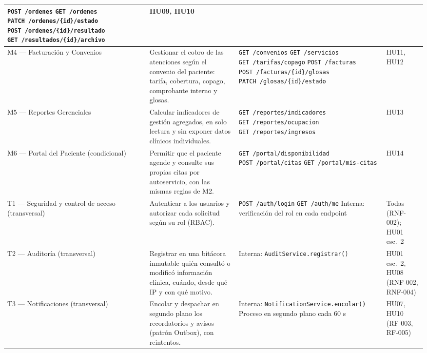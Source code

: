 \documentclass[11pt,a4paper]{article}
\newcommand{\ep}[2]{{\footnotesize\texttt{\textcolor{guinda}{#1}~#2}}}
\begin{document}
\begin{xltabular}{\linewidth}{|P{2.9cm}|L|P{5.6cm}|P{2.3cm}|}
    \ep{POST}{/ordenes} \newline
    \ep{GET}{/ordenes} \newline
    \ep{PATCH}{/ordenes/\{id\}/estado} \newline
    \ep{POST}{/ordenes/\{id\}/resultado} \newline
    \ep{GET}{/resultados/\{id\}/archivo} &
    HU09, HU10 \\ \hline
  M4 --- Facturación y Convenios &
    Gestionar el cobro de las atenciones según el convenio del paciente: tarifa, cobertura,
    copago, comprobante interno y glosas. &
    \ep{GET}{/convenios} \newline
    \ep{GET}{/servicios} \newline
    \ep{GET}{/tarifas/copago} \newline
    \ep{POST}{/facturas} \newline
    \ep{POST}{/facturas/\{id\}/glosas} \newline
    \ep{PATCH}{/glosas/\{id\}/estado} &
    HU11, HU12 \\ \hline
  M5 --- Reportes Gerenciales &
    Calcular indicadores de gestión agregados, en solo lectura y sin exponer datos clínicos
    individuales. &
    \ep{GET}{/reportes/indicadores} \newline
    \ep{GET}{/reportes/ocupacion} \newline
    \ep{GET}{/reportes/ingresos} &
    HU13 \\ \hline
  M6 --- Portal del Paciente (condicional) &
    Permitir que el paciente agende y consulte sus propias citas por autoservicio, con las
    mismas reglas de M2. &
    \ep{GET}{/portal/disponibilidad} \newline
    \ep{POST}{/portal/citas} \newline
    \ep{GET}{/portal/mis-citas} &
    HU14 \\ \hline
  T1 --- Seguridad y control de acceso (transversal) &
    Autenticar a los usuarios y autorizar cada solicitud según su rol (RBAC). &
    \ep{POST}{/auth/login} \newline
    \ep{GET}{/auth/me} \newline
    Interna: verificación del rol en cada endpoint &
    Todas (RNF-002); HU01 esc.~2 \\ \hline
  T2 --- Auditoría (transversal) &
    Registrar en una bitácora inmutable quién consultó o modificó información clínica, cuándo,
    desde qué IP y con qué motivo. &
    Interna: {\footnotesize\texttt{AuditService.registrar()}} &
    HU01 esc.~2, HU08 (RNF-002, RNF-004) \\ \hline
  T3 --- Notificaciones (transversal) &
    Encolar y despachar en segundo plano los recordatorios y avisos (patrón Outbox), con
    reintentos. &
    Interna: {\footnotesize\texttt{NotificationService.encolar()}} \newline
    Proceso en segundo plano cada 60 s &
    HU07, HU10 (RF-003, RF-005) \\ \hline
\end{xltabular}
\end{document}

